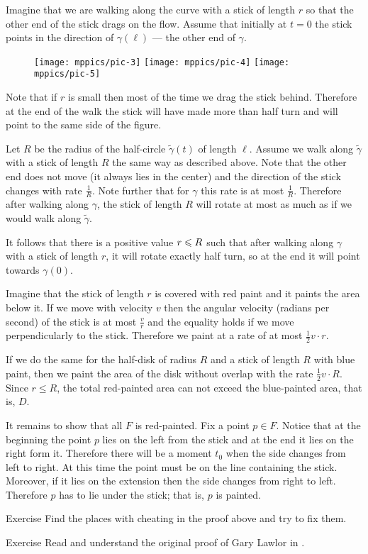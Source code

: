 Imagine that we are walking along the curve with a stick of length $r$ so that the other end of the stick drags on the flow.
Assume that initially at $t=0$ the stick points in the direction of $\gamma(\ell)$ --- the other end of $\gamma$.

\begin{wrapfigure}{r}{34 mm}
\vskip-0mm
\centering
\texttt{[image: mppics/pic-3]}
\bigskip
\texttt{[image: mppics/pic-4]}
\bigskip
\texttt{[image: mppics/pic-5]}
\end{wrapfigure}

Note that if $r$ is small then most of the time we drag the stick behind. Therefore at the end of the walk the stick will have made more than half turn and will point to the same side of the figure.

Let $R$ be the radius of the half-circle $\tilde\gamma(t)$ of length $\ell$.
Assume we walk along $\tilde\gamma$  with a stick of length $R$ the same way as described above.
Note that the other end does not move (it always lies in the center) and the direction of the stick changes with rate $\tfrac1R$.
Note further that for $\gamma$ this rate is at most $\tfrac1R$.
Therefore after walking along $\gamma$,
the stick of length $R$ will rotate at most as much as if we would walk along $\tilde\gamma$.

It follows that there is a positive value $r\z\le R$ such that after walking along $\gamma$ with a stick of length $r$, it will rotate exactly half turn, so at the end it will point towards $\gamma(0)$.

Imagine that the stick of length $r$ is covered with red paint and it paints the area below it.
If we move with velocity $v$ then the angular velocity (radians per second) of the stick is at most $\tfrac vr$ and the equality holds if we move perpendicularly to the stick.
Therefore we paint at a rate of at most $\tfrac12 v\cdot r$.

If we do the same for the half-disk of radius $R$ and a stick of length $R$ with blue paint,
then we paint the area of the disk without overlap with the rate $\tfrac12 v\cdot R$.
Since $r\le R$, the total red-painted area can not exceed the blue-painted area, that is, $D$. 

It remains to show that all $F$ is red-painted.
Fix a point $p\in F$.
Notice that at the beginning the point $p$ lies on the left from the stick and at the end it lies on the right form it.
Therefore there will be a moment $t_0$ when the side changes from left to right.
At this time the point must be on the line containing the stick. 
Moreover, if it lies on the extension then the side changes from right to left. Therefore $p$ has to lie under the stick; that is, $p$ is painted.

\qeds

\begin{thm}{Exercise}
Find the places with cheating in the proof above and try to fix them.
\end{thm}


\begin{thm}{Exercise} Read and understand the original proof of Gary Lawlor in \cite{lawlor}.
\end{thm}










